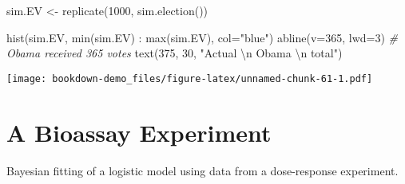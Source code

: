 \documentclass[
]{book}
\newenvironment{Shaded}{\begin{snugshade}}{\end{snugshade}}
\newcommand{\AttributeTok}[1]{\textcolor[rgb]{0.77,0.63,0.00}{#1}}
\newcommand{\CommentTok}[1]{\textcolor[rgb]{0.56,0.35,0.01}{\textit{#1}}}
\newcommand{\ControlFlowTok}[1]{\textcolor[rgb]{0.13,0.29,0.53}{\textbf{#1}}}
\newcommand{\DecValTok}[1]{\textcolor[rgb]{0.00,0.00,0.81}{#1}}
\newcommand{\FloatTok}[1]{\textcolor[rgb]{0.00,0.00,0.81}{#1}}
\newcommand{\FunctionTok}[1]{\textcolor[rgb]{0.00,0.00,0.00}{#1}}
\newcommand{\NormalTok}[1]{#1}
\newcommand{\OtherTok}[1]{\textcolor[rgb]{0.56,0.35,0.01}{#1}}
\newcommand{\SpecialCharTok}[1]{\textcolor[rgb]{0.00,0.00,0.00}{#1}}
\newcommand{\StringTok}[1]{\textcolor[rgb]{0.31,0.60,0.02}{#1}}
\begin{document}
\begin{Shaded}
\end{Shaded}

\begin{Shaded}
\begin{Highlighting}[]
\NormalTok{sim.EV }\OtherTok{\textless{}{-}} \FunctionTok{replicate}\NormalTok{(}\DecValTok{1000}\NormalTok{, }\FunctionTok{sim.election}\NormalTok{())}
\end{Highlighting}
\end{Shaded}

\begin{Shaded}
\begin{Highlighting}[]
\FunctionTok{hist}\NormalTok{(sim.EV, }\FunctionTok{min}\NormalTok{(sim.EV) }\SpecialCharTok{:} \FunctionTok{max}\NormalTok{(sim.EV), }\AttributeTok{col=}\StringTok{"blue"}\NormalTok{)}
\FunctionTok{abline}\NormalTok{(}\AttributeTok{v=}\DecValTok{365}\NormalTok{, }\AttributeTok{lwd=}\DecValTok{3}\NormalTok{)  }\CommentTok{\# Obama received 365 votes}
\FunctionTok{text}\NormalTok{(}\DecValTok{375}\NormalTok{, }\DecValTok{30}\NormalTok{, }\StringTok{"Actual }\SpecialCharTok{\textbackslash{}n}\StringTok{ Obama }\SpecialCharTok{\textbackslash{}n}\StringTok{ total"}\NormalTok{)}
\end{Highlighting}
\end{Shaded}

\texttt{[image: bookdown-demo\_files/figure-latex/unnamed-chunk-61-1.pdf]}

\hypertarget{a-bioassay-experiment}{%
\section{A Bioassay Experiment}\label{a-bioassay-experiment}}

Bayesian fitting of a logistic model using data from a dose-response experiment.
\end{document}
